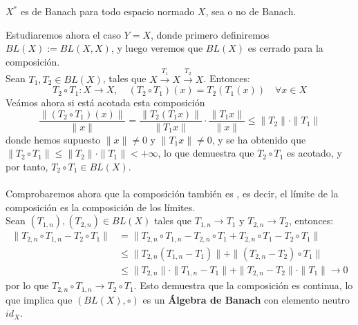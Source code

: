 \begin{coro}
    $X^*$ es de Banach para todo espacio normado $X$, sea o no de Banach.
\end{coro}

\noindent
Estudiaremos ahora el caso $Y=X$, donde primero definiremos $BL(X) := BL(X, X)$, y luego veremos que $BL(X)$ es cerrado para la composición. \\
\noindent
Sean $T_1, T_2 \in BL(X)$, tales que $X \xrightarrow{T_1} X \xrightarrow{T_2} X$. Entonces:
\begin{equation*}
    T_2 \circ T_1: X \longrightarrow X, \quad (T_2 \circ T_1)(x) = T_2(T_1(x)) \quad \forall x \in X
\end{equation*}
Veámos ahora si está acotada esta composición 
\begin{equation*}
    \dfrac{\|(T_2 \circ T_1) (x)\|}{\|x\|} = \frac{\|T_2(T_1 x)\|}{\|T_1 x\|} \cdot \frac{\|T_1 x\|}{\|x\|} \le \|T_2\| \cdot \|T_1\|
\end{equation*}
donde hemos supuesto $\|x\|\neq 0$ y $\|T_1 x\|\neq 0$, y se ha obtenido que $\|T_2 \circ T_1\| \le \|T_2\| \cdot \|T_1\| < +\infty$, lo que demuestra que $T_2 \circ T_1$ es acotado, y por tanto, $T_2 \circ T_1 \in BL(X)$. \\ \\

\noindent
Comprobaremos ahora que la composición también es , es decir, el límite de la composición es la composición de los límites. \\
\noindent
Sean $(T_{1,n}), (T_{2,n}) \in BL(X)$ tales que $T_{1,n} \to T_1$ y $T_{2,n} \to T_2$, entonces:
\begin{align*}
\|T_{2,n} \circ T_{1,n} - T_2 \circ T_1\| &= \|T_{2,n} \circ T_{1,n} - T_{2,n} \circ T_1 + T_{2,n} \circ T_1 - T_2 \circ T_1\| \\
&\le \|T_{2,n}(T_{1,n} - T_1)\| + \|(T_{2,n} - T_2) \circ T_1\| \\
&\le \|T_{2,n}\| \cdot \|T_{1,n} - T_1\| + \|T_{2,n} - T_2\| \cdot \|T_1\| \to 0
\end{align*}
por lo que $T_{2,n} \circ T_{1,n} \to T_2 \circ T_1$. Esto demuestra que la composición es continua, lo que implica que $(BL(X), \circ)$ es un \textbf{Álgebra de Banach} con elemento neutro $id_X$.

